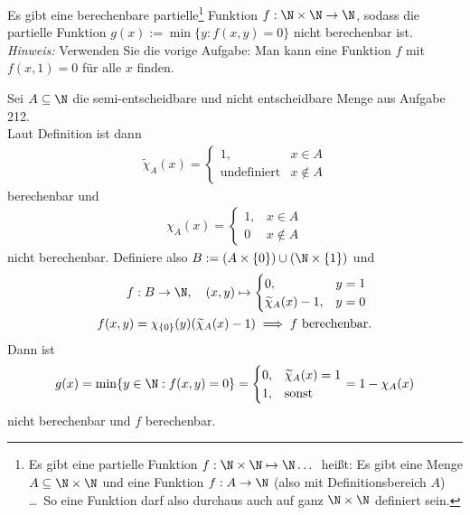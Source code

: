 
\begin{exercise}[213]

Es gibt eine berechenbare partielle\footnote{\glqq Es gibt eine partielle Funktion
$f: \N \times \N \mapsto \N \dots$\grqq\ heißt:
\glqq Es gibt eine Menge $A \subseteq \N \times \N$ und eine Funktion $f: A \to \N$
(also mit Definitionsbereich $A$) \dots\grqq\ So eine Funktion darf also durchaus
auch auf ganz $\N \times \N$ definiert sein.}
Funktion $f: \N \times \N \to \N$, sodass die partielle Funktion
$g(x) := \min\{y: f(x,y) = 0\}$ nicht berechenbar ist. \\
\textit{Hinweis:} Verwenden Sie die vorige Aufgabe: Man kann eine Funktion
$f$ mit $f(x,1) = 0$ für alle $x$ finden.

\end{exercise}


\begin{solution}

Sei $A \subseteq \N$ die semi-entscheidbare und nicht entscheidbare Menge aus Aufgabe 212. \\
Laut Definition ist dann
\begin{align*}
  \widetilde{\chi}_A(x) = \begin{cases}
    1, & x \in A \\
    \text{undefiniert} & x \notin A
  \end{cases}
\end{align*}
berechenbar und
\begin{align*}
  \chi_A(x) = \begin{cases}
    1, & x \in A \\
    0 & x \notin A
  \end{cases}
\end{align*}
nicht berechenbar. Definiere also $B := (A \times \{0\}) \cup (\N \times \{1\})$
und
\begin{align*}
  f&: B \to \N, \quad (x,y) \mapsto \begin{cases}
      0, & y = 1 \\
      \widetilde{\chi}_A(x) - 1, & y = 0
  \end{cases} \\
  f(x,y) &= \chi_{\{0\}}(y)(\widetilde{\chi}_A(x) - 1) \implies f \text{ berechenbar}.
\end{align*}
Dann ist
\begin{align*}
  g(x) = \min\{y \in \N: f(x,y) = 0\} =
  \begin{cases}
      0, & \widetilde{\chi}_A(x) = 1 \\
      1, & \text{sonst}
  \end{cases}
  = 1 - \chi_A(x)
\end{align*}
nicht berechenbar und $f$ berechenbar.
\end{solution}
